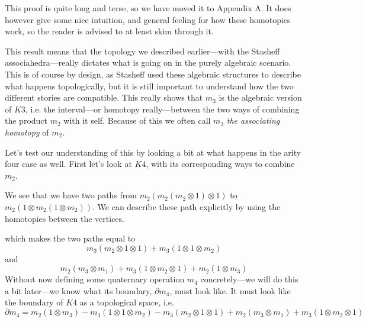 This proof is quite long and terse, so we have moved it to Appendix A. It does however give some nice intuition, and general feeling for how these homotopies work, so the reader is advised to at least skim through it. 

This result means that the topology we described earlier---with the Stasheff associahedra---really dictates what is going on in the purely algebraic scenario. This is of course by design, as Stasheff used these algebraic structures to describe what happens topologically, but it is still important to understand how the two different stories are compatible. This really shows that $m_3$ is the algebraic version of $K3$, i.e. the interval---or homotopy really---between the two ways of combining the product $m_2$ with it self. Because of this we often call $m_3$ \emph{the associating homotopy} of $m_2$. 

Let's test our understanding of this by looking a bit at what happens in the arity four case as well. First let's look at $K4$, with its corresponding ways to combine $m_2$. 

\hspace{2mm}

\begin{center}
\def\svgwidth{0.7\textwidth}

\end{center}

\hspace{1mm}

We see that we have two paths from $m_2(m_2(m_2\otimes 1)\otimes 1)$ to $m_2(1\otimes m_2(1\otimes m_2))$. We can describe these path explicitly by using the homotopies between the vertices. 

\hspace{1mm}

\begin{center}
\def\svgwidth{0.7\textwidth}

\end{center}

\hspace{1mm}

which makes the two paths equal to
\begin{equation*}
    m_3(m_2\otimes 1\otimes 1) + m_3(1\otimes 1\otimes m_2)
\end{equation*}
and 
\begin{equation*}
    m_2(m_3\otimes m_1)+m_3(1\otimes m_2\otimes 1)+m_2(1\otimes m_3)
\end{equation*}
Without now defining some quaternary operation $m_4$ concretely---we will do this a bit later---we know what its boundary, $\partial m_4$, must look like. It must look like the boundary of $K4$ as a topological space, i.e. 
\begin{equation*}
    \partial m_4 = m_2(1\otimes m_3) - m_3(1\otimes 1\otimes m_2) - m_3(m_2\otimes 1\otimes 1) + m_2(m_3\otimes m_1)+m_3(1\otimes m_2\otimes 1)
\end{equation*}

